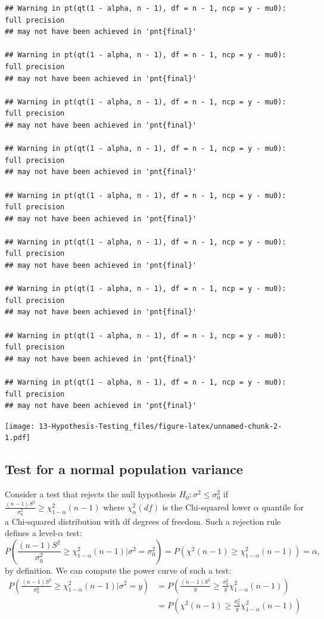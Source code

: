 \documentclass[
]{book}
\begin{document}
\begin{verbatim}
## Warning in pt(qt(1 - alpha, n - 1), df = n - 1, ncp = y - mu0): full precision
## may not have been achieved in 'pnt{final}'

## Warning in pt(qt(1 - alpha, n - 1), df = n - 1, ncp = y - mu0): full precision
## may not have been achieved in 'pnt{final}'

## Warning in pt(qt(1 - alpha, n - 1), df = n - 1, ncp = y - mu0): full precision
## may not have been achieved in 'pnt{final}'

## Warning in pt(qt(1 - alpha, n - 1), df = n - 1, ncp = y - mu0): full precision
## may not have been achieved in 'pnt{final}'

## Warning in pt(qt(1 - alpha, n - 1), df = n - 1, ncp = y - mu0): full precision
## may not have been achieved in 'pnt{final}'

## Warning in pt(qt(1 - alpha, n - 1), df = n - 1, ncp = y - mu0): full precision
## may not have been achieved in 'pnt{final}'

## Warning in pt(qt(1 - alpha, n - 1), df = n - 1, ncp = y - mu0): full precision
## may not have been achieved in 'pnt{final}'

## Warning in pt(qt(1 - alpha, n - 1), df = n - 1, ncp = y - mu0): full precision
## may not have been achieved in 'pnt{final}'

## Warning in pt(qt(1 - alpha, n - 1), df = n - 1, ncp = y - mu0): full precision
## may not have been achieved in 'pnt{final}'
\end{verbatim}

\texttt{[image: 13-Hypothesis-Testing\_files/figure-latex/unnamed-chunk-2-1.pdf]}

\hypertarget{test-for-a-normal-population-variance}{%
\subsection{Test for a normal population variance}\label{test-for-a-normal-population-variance}}

Consider a test that rejects the null hypothesis \(H_0:\sigma^2 \leq \sigma_0^2\) if \(\frac{(n-1)S^2}{\sigma_0^2} \geq \chi^2_{1-\alpha}(n-1)\) where \(\chi^2_{\alpha}(df)\) is the Chi-squared lower \(\alpha\) quantile for a Chi-squared distribution with df degrees of freedom. Such a rejection rule defines a level-\(\alpha\) test:
\[P\left(\frac{(n-1)S^2}{\sigma_0^2} \geq  \chi^2_{1-\alpha}(n-1)|\sigma^2 = \sigma_0^2\right) = P\left(\chi^{2}(n-1) \geq  \chi^2_{1-\alpha}(n-1)\right) = \alpha,\]
by definition. We can compute the power curve of such a test:
\begin{align*}
P\left(\frac{(n-1)S^2}{\sigma_0^2} \geq  \chi^2_{1-\alpha}(n-1)|\sigma^2 = y\right) & = P\left(\frac{(n-1)S^2}{y} \geq  \frac{\sigma_0^2}{y}\chi^2_{1-\alpha}(n-1)\right)\\
& = P\left(\chi^2(n-1) \geq  \frac{\sigma_0^2}{y}\chi^2_{1-\alpha}(n-1)\right)
\end{align*}
\end{document}
